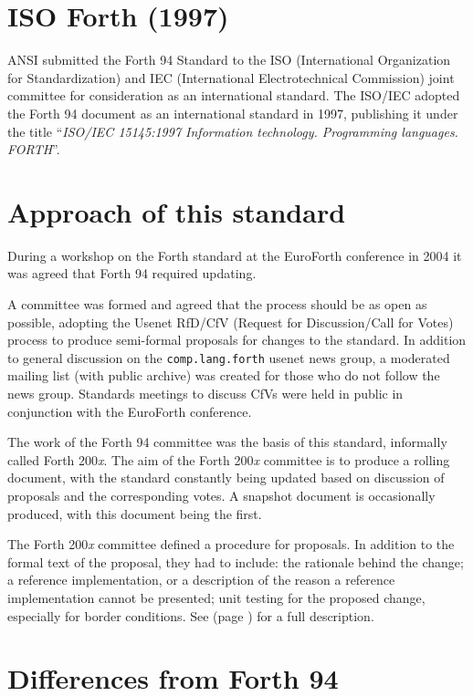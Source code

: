 \section{ISO Forth (1997)}
\label{diff:iso}

ANSI submitted the Forth 94 Standard to the
ISO (International Organization for Standardization) and
IEC (International Electrotechnical Commission) joint committee for
consideration as an international standard.
The ISO/IEC adopted the Forth 94 document as an international standard
in 1997, publishing it under the title ``\emph{ISO/IEC 15145:1997
Information technology.  Programming languages.  FORTH}''.


\section{Approach of this standard} %
\label{diff:approach}

During a workshop on the Forth standard at the EuroForth conference in
2004 it was agreed that  Forth 94 required updating.

A committee was formed and agreed that the process should be as open
as possible, adopting the Usenet RfD/CfV (Request for Discussion/Call
for Votes) process to produce semi-formal proposals for changes to the
standard.  In addition to general discussion on the \texttt{comp.lang.forth}
usenet news group, a moderated mailing list (with public archive) was
created for those who do not follow the news group.
Standards meetings to discuss CfVs were held in public in
conjunction with the EuroForth conference.

The work of the Forth 94 committee was the basis of this standard,
informally called Forth 200\emph{x}.  The aim of the Forth 200\emph{x}
committee is to produce a rolling document, with the standard constantly
being updated based on discussion of proposals and the corresponding
votes.  A snapshot document is occasionally produced, with this document
being the first.

The Forth 200\emph{x} committee defined a procedure for proposals.  In
addition to the formal text of the proposal, they had to include:
the rationale behind the change;
a reference implementation, or a description of the reason a reference
implementation cannot be presented;
unit testing for the proposed change, especially for border conditions.
See  (page \pageref{process}) for a full description.


\section{Differences from Forth 94} %
\label{diff:forth94}

